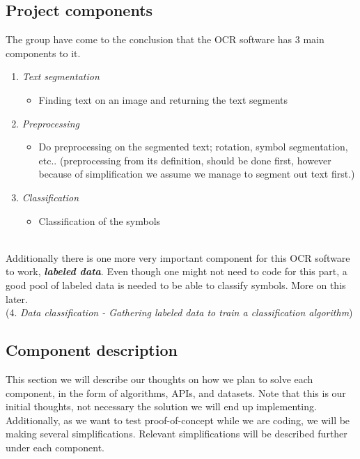 \documentclass[11pt,a4paper,UKenglish]{article}
\begin{document}
\subsection{Project components}
The group have come to the conclusion that the OCR software has 3 main
components to it.
\begin{enumerate}
 \item{\textit{Text segmentation}}
 \begin{itemize}
  \item{Finding text on an image and returning the text segments}
 \end{itemize}
 \item{\textit{Preprocessing}}
 \begin{itemize}
  \item{Do preprocessing on the segmented text; rotation, symbol segmentation,
  etc.. (preprocessing from its definition, should be done first, however
  because of simplification we assume we manage to segment out text first.)}
 \end{itemize}
 \item{\textit{Classification}}
 \begin{itemize}
  \item{Classification of the symbols}
 \end{itemize}
\end{enumerate}
\noindent \\ Additionally there is one more very important component for this
OCR software to work, \textit{\textbf{labeled data}}. Even though one might not
need to code for this part, a good pool of labeled data is needed to be able to
classify symbols. More on this later.
\noindent \\ (4. \textit{Data classification - Gathering labeled data to train a classification algorithm})

\subsection{Component description}
This section we will describe our thoughts on how we plan to solve each
component, in the form of algorithms, APIs, and datasets. Note that this is our
initial thoughts, not necessary the solution we will end up implementing.
Additionally, as we want to test proof-of-concept while we are coding, we will
be making several simplifications. Relevant simplifications will be described
further under each component.
\end{document}
